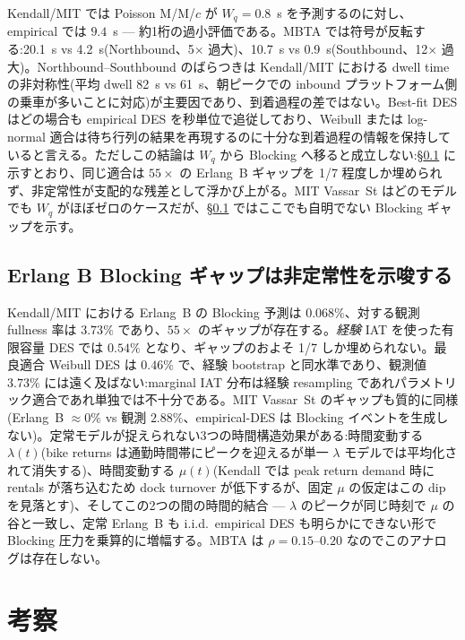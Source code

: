 Kendall/MIT では Poisson M/M/$c$ が $W_q = 0.8$~s を予測するのに対し、empirical では $9.4$~s — 約1桁の過小評価である。MBTA では符号が反転する:20.1~s vs 4.2~s(Northbound、5$\times$ 過大)、10.7~s vs 0.9~s(Southbound、12$\times$ 過大)。Northbound--Southbound のばらつきは Kendall/MIT における dwell time の非対称性(平均 dwell 82~s vs 61~s、朝ピークでの inbound プラットフォーム側の乗車が多いことに対応)が主要因であり、到着過程の差ではない。Best-fit DES はどの場合も empirical DES を秒単位で追従しており、Weibull または log-normal 適合は待ち行列の結果を再現するのに十分な到着過程の情報を保持していると言える。ただしこの結論は $W_q$ から Blocking へ移ると成立しない:\S\ref{sec:results-erlangb} に示すとおり、同じ適合は $55\times$ の Erlang~B ギャップを 1/7 程度しか埋められず、非定常性が支配的な残差として浮かび上がる。MIT Vassar~St はどのモデルでも $W_q$ がほぼゼロのケースだが、\S\ref{sec:results-erlangb} ではここでも自明でない Blocking ギャップを示す。

\subsection{Erlang B Blocking ギャップは非定常性を示唆する}\label{sec:results-erlangb}

Kendall/MIT における Erlang~B の Blocking 予測は $0.068\%$、対する観測 fullness 率は $3.73\%$ であり、$55\times$ のギャップが存在する。\emph{経験} IAT を使った有限容量 DES では $0.54\%$ となり、ギャップのおよそ 1/7 しか埋められない。最良適合 Weibull DES は $0.46\%$ で、経験 bootstrap と同水準であり、観測値 $3.73\%$ には遠く及ばない:marginal IAT 分布は経験 resampling であれパラメトリック適合であれ単独では不十分である。MIT Vassar~St のギャップも質的に同様(Erlang~B $\approx 0\%$ vs 観測 $2.88\%$、empirical-DES は Blocking イベントを生成しない)。定常モデルが捉えられない3つの時間構造効果がある:時間変動する $\lambda(t)$(bike returns は通勤時間帯にピークを迎えるが単一 $\lambda$ モデルでは平均化されて消失する)、時間変動する $\mu(t)$(Kendall では peak return demand 時に rentals が落ち込むため dock turnover が低下するが、固定 $\mu$ の仮定はこの dip を見落とす)、そしてこの2つの間の時間的結合 — $\lambda$ のピークが同じ時刻で $\mu$ の谷と一致し、定常 Erlang~B も i.i.d.\ empirical DES も明らかにできない形で Blocking 圧力を乗算的に増幅する。MBTA は $\rho = 0.15$--$0.20$ なのでこのアナログは存在しない。

\section{考察}\label{sec:discussion}

